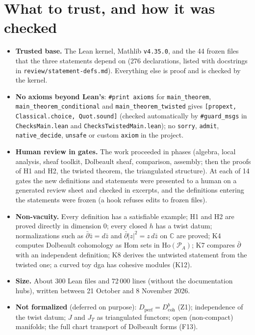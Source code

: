 \documentclass[11pt,a4paper]{article}
\newcommand{\code}[1]{\texttt{#1}}
\newcommand{\dbar}{\bar\partial}
\newcommand{\Ho}{\mathrm{Ho}}
\newcommand{\Dperf}{D_{\mathrm{perf}}}
\begin{document}
\section{What to trust, and how it was checked}
\begin{itemize}
\item \textbf{Trusted base.} The Lean kernel, Mathlib \code{v4.35.0}, and the 44 frozen files that
the three statements depend on (276 declarations, listed with docstrings in
\code{review/statement-defs.md}). Everything else is proof and is checked by the kernel.
\item \textbf{No axioms beyond Lean's}: \code{\#print axioms} for \code{main\_theorem},
\code{main\_theorem\_conditional} and \code{main\_theorem\_twisted} gives
\code{[propext, Classical.choice, Quot.sound]} (checked automatically by \code{\#guard\_msgs} in
\code{ChecksMain.lean} and \code{ChecksTwistedMain.lean}); no \code{sorry}, \code{admit},
\code{native\_decide}, \code{unsafe} or custom \code{axiom} in the project.
\item \textbf{Human review in gates.} The work proceeded in phases (algebra, local analysis,
sheaf toolkit, Dolbeault sheaf, comparison, assembly; then the proofs of H1 and H2, the twisted
theorem, the triangulated structure). At each of 14 gates the new definitions and statements
were presented to a human on a generated review sheet and checked in excerpts, and the
definitions entering the statements were frozen (a hook refuses edits to frozen files).
\item \textbf{Non-vacuity.} Every definition has a satisfiable example; H1 and H2 are proved
directly in dimension $0$; every closed $h$ has a twist datum; normalizations such as
$\dbar\bar z=d\bar z$ and $\dbar|z|^2=z\,d\bar z$ on $\mathbb C$ are proved; K4 computes Dolbeault
cohomology as Hom sets in $\Ho(\mathcal P_A)$; K7 compares $\dbar$ with an independent definition;
K8 derives the untwisted statement from the twisted one; a curved toy dga has cohesive modules
(K12).
\item \textbf{Size.} About 300 Lean files and 72\,000 lines (without the documentation hubs),
written between 21 October and 8 November 2026.
\item \textbf{Not formalized} (deferred on purpose): $\Dperf=D^b_{\mathrm{coh}}$ (Z1); independence of
the twist datum; $J$ and $J_T$ as triangulated functors; open (non-compact) manifolds; the full
chart transport of Dolbeault forms (F13).
\end{itemize}
\end{document}
